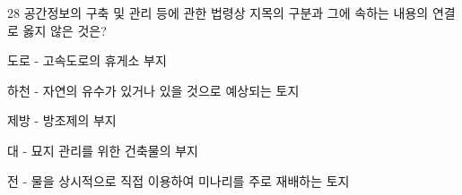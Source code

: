 \begin{question}{28}
공간정보의 구축 및 관리 등에 관한 법령상 지목의 구분과 그에 속하는 내용의 연결로 옳지 않은 것은?
\begin{choices}
  \item 도로 - 고속도로의 휴게소 부지
  \item 하천 - 자연의 유수가 있거나 있을 것으로 예상되는 토지
  \item 제방 - 방조제의 부지
  \item 대 - 묘지 관리를 위한 건축물의 부지
  \item 전 - 물을 상시적으로 직접 이용하여 미나리를 주로 재배하는 토지
\end{choices}
\end{question}

